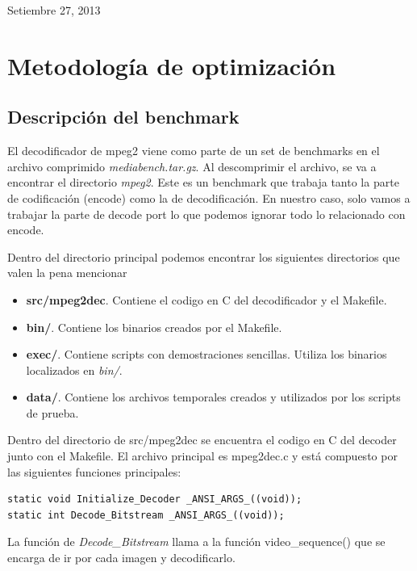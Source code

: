 \documentclass[journal]{IEEEtran}
\begin{document}
\hfill Setiembre 27, 2013

\section{Metodolog\'{i}a de optimizaci\'{o}n}

\subsection{Descripci\'{o}n del benchmark}
El decodificador de mpeg2 viene como parte de un set de benchmarks en el archivo comprimido \textit{mediabench.tar.gz}. Al descomprimir el archivo, se va a encontrar el directorio \textit{mpeg2}. Este es un benchmark que trabaja tanto la parte de codificaci\'{o}n (encode) como la de decodificaci\'{o}n. En nuestro caso, solo vamos a trabajar la parte de decode port lo que podemos ignorar todo lo relacionado con encode.

Dentro del directorio principal podemos encontrar los siguientes directorios que valen la pena mencionar \newline

\begin{itemize}
\item \textbf{src/mpeg2dec}. Contiene el codigo en C del decodificador y el Makefile.
\item \textbf{bin/}. Contiene los binarios creados por el Makefile.
\item \textbf{exec/}. Contiene scripts con demostraciones sencillas. Utiliza los binarios localizados en \textit{bin/}.
\item \textbf{data/}. Contiene los archivos temporales creados y utilizados por los scripts de prueba.
\end{itemize}

Dentro del directorio de src/mpeg2dec se encuentra el codigo en C del decoder junto con el Makefile. El archivo principal es mpeg2dec.c y est\'{a} compuesto por las siguientes funciones principales:

\footnotesize \begin{verbatim}
static void Initialize_Decoder _ANSI_ARGS_((void));
static int Decode_Bitstream _ANSI_ARGS_((void));
\end{verbatim}
\normalsize

La funci\'{o}n de \textit{Decode\_Bitstream} llama a la funci\'{o}n video\_sequence() que se encarga de ir por cada imagen y decodificarlo. \newline
\end{document}
